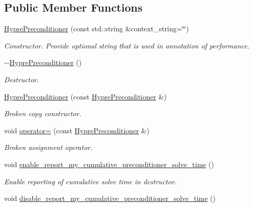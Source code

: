 \subsection*{Public Member Functions}
\begin{DoxyCompactItemize}
\item 
\hyperlink{classoomph_1_1HyprePreconditioner_af65f23a658889324894e331af515a71c}{Hypre\+Preconditioner} (const std\+::string \&context\+\_\+string=\char`\"{}\char`\"{})
\begin{DoxyCompactList}\small\item\em Constructor. Provide optional string that is used in annotation of performance. \end{DoxyCompactList}\item 
\hyperlink{classoomph_1_1HyprePreconditioner_a024286a123aee3db8b06db9f0c97bbf0}{$\sim$\+Hypre\+Preconditioner} ()
\begin{DoxyCompactList}\small\item\em Destructor. \end{DoxyCompactList}\item 
\hyperlink{classoomph_1_1HyprePreconditioner_aca5c97a9cc1e7eac7dae52ca7dd89801}{Hypre\+Preconditioner} (const \hyperlink{classoomph_1_1HyprePreconditioner}{Hypre\+Preconditioner} \&)
\begin{DoxyCompactList}\small\item\em Broken copy constructor. \end{DoxyCompactList}\item 
void \hyperlink{classoomph_1_1HyprePreconditioner_ae5ca775c231584c86193d2219a9c452a}{operator=} (const \hyperlink{classoomph_1_1HyprePreconditioner}{Hypre\+Preconditioner} \&)
\begin{DoxyCompactList}\small\item\em Broken assignment operator. \end{DoxyCompactList}\item 
void \hyperlink{classoomph_1_1HyprePreconditioner_afae82e15a88443946509fcb8fd91da75}{enable\+\_\+report\+\_\+my\+\_\+cumulative\+\_\+preconditioner\+\_\+solve\+\_\+time} ()
\begin{DoxyCompactList}\small\item\em Enable reporting of cumulative solve time in destructor. \end{DoxyCompactList}\item 
void \hyperlink{classoomph_1_1HyprePreconditioner_a3936efe626674a8dbe17d842cb60423e}{disable\+\_\+report\+\_\+my\+\_\+cumulative\+\_\+preconditioner\+\_\+solve\+\_\+time} ()

\end{DoxyCompactItemize}
